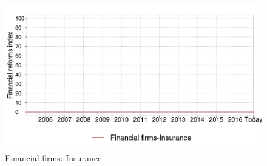 \documentclass[a4paper,12pt,leqno]{article}
\begin{document}
\begin{figure}[H]
  \caption{Financial firms: Insurance}
  \centering
  \includegraphics[width=0.65\paperwidth,height=0.45\paperwidth]{../GRAPHS/frm_index_financial_firms_insurance.png}
\end{figure}
\end{document}

